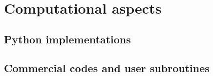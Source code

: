 %
\cleardoublepage {}
\chapter{Computational aspects}
\section{Python implementations}
\section{Commercial codes and user subroutines}






